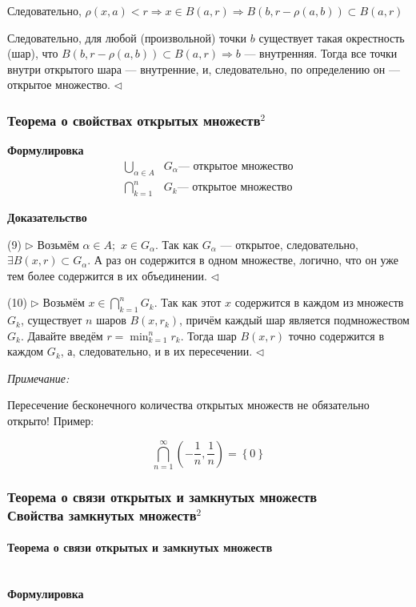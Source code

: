 \documentclass{article}
\def\dbl{\,\,}
\let\vanillaparagraph\paragraph
\renewcommand{\paragraph}[1]{\vanillaparagraph{#1}\mbox{}\\}
\begin{document}
Следовательно, $\rho(x, a) < r \Rightarrow x \in B(a, r) \Rightarrow B(b, r - \rho(a, b)) \subset B(a, r)$

Следовательно, для любой (произвольной) точки $b$ существует такая окрестность (шар), что $B(b, r - \rho(a, b)) \subset B(a, r) \Rightarrow b$ --- внутренняя.
Тогда все точки внутри открытого шара --- внутренние, и, следовательно, по определению он --- открытое множество.
$\lhd$

\subsubsection{Теорема о свойствах открытых множеств\texorpdfstring{$^2$}{}}

\textbf{Формулировка}
\begin{align}
    \bigcup_{\alpha \in A} &G_\alpha \textit{--- открытое множество}\\
    \bigcap_{k = 1}^{n} &G_k \textit{--- открытое множество}
\end{align}

\textbf{Доказательство}

(9) $\rhd$ Возьмём $\alpha \in A; \dbl x \in G_\alpha$. Так как $G_\alpha$ --- открытое, следовательно, $\exists B(x, r) \subset G_\alpha$. А раз он содержится в одном множестве, логично, что он уже тем более содержится в их объединении. $\lhd$

(10) $\rhd$ Возьмём $x \in \bigcap_{k = 1}^{n} G_k $. Так как этот $x$ содержится в каждом из множеств $G_k$, существует $n$ шаров $B(x, r_k)$, причём каждый шар является подмножеством $G_k$. Давайте введём $r = \min_{k = 1}^n{r_k}$. Тогда шар $B(x, r)$ точно содержится в каждом $G_k$, а, следовательно, и в их пересечении. $\lhd$

\textit{Примечание:}

Пересечение бесконечного количества открытых множеств не обязательно открыто! Пример:

$$
\bigcap_{n=1}^\infty{\left(-\frac{1}{n},\frac{1}{n}\right)} = \left\{0\right\}
$$

\subsubsection{Теорема о связи открытых и замкнутых множеств\texorpdfstring{\\}{} Свойства замкнутых множеств\texorpdfstring{$^2$}{}}

\paragraph{Теорема о связи открытых и замкнутых множеств}
\textbf{Формулировка}
\end{document}
